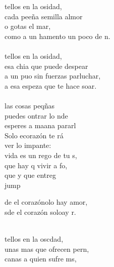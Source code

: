 \begin{cancion}%
	tellos en la osidad,\\
	cada peeña semilla almor\\
	o gotas  el mar,\\
	como a un hamento un poco de n.\\
	\jump\\
	tellos en la osidad,\\
	esa chia que puede despear\\
	a un puo sin fuerzas parluchar,\\
	a esa espeza que te hace soar.\\
	\jump\\
	 las cosas peqñas \\
	puedes ontrar lo nde\\
	esperes a maana pararl\\
	Solo ecorazón te rá \\
	ver lo impante: \\
	 vida es un rego de tu s,\\
	que hay q vivir a fo, \\
	que y que entreg   \\jump\\
	\begin{chorus}%
	de el corazónolo hay amor,\\
	sde el corazón soloay r.\\
	\end{chorus}%
	\jump\\
	tellos en la oscdad,\\
	unas mas que ofrecen pern, \\
	canas a quien sufre ms,\\

\end{cancion}
